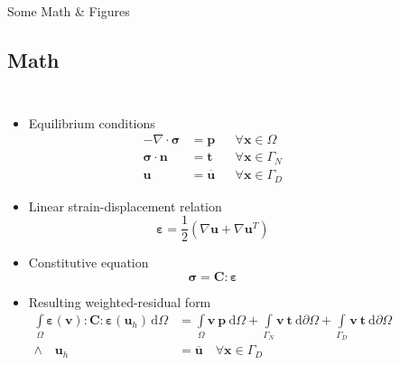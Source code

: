 \documentclass[8pt, handout, aspectratio = 1510]{beamer}
\begin{document}
	\begin{frame}{Some Math \& Figures}

		\subsection{Math}
		\begin{columns}
				\begin{itemize}
					\item Equilibrium conditions
							\begin{subequations}
								\begin{align}
									-\nabla \cdot \boldsymbol{\sigma} &= \boldsymbol{p} &&\forall \boldsymbol{x} \in \Omega \\
									\boldsymbol{\sigma} \cdot \boldsymbol{n} &= \boldsymbol{t} &&\forall \boldsymbol{x} \in \Gamma_N \\
									\boldsymbol{u} &= \overline{\boldsymbol{u}} &&\forall \boldsymbol{x} \in \Gamma_D
								\end{align}
							\end{subequations}

					\item Linear strain-displacement relation
						\begin{equation}
							\boldsymbol{\varepsilon} = \frac{1}{2} \left( \nabla \boldsymbol{u} + \nabla \boldsymbol{u}^T \right)
						\end{equation}

					\item Constitutive equation
						\begin{equation}
							\boldsymbol{\sigma} = \boldsymbol{C} : \boldsymbol{\varepsilon}
						\end{equation}

					\item Resulting weighted-residual form
						\begin{equation}
							\begin{aligned}
								\int \limits_\Omega \boldsymbol{\varepsilon}(\boldsymbol{v}) : \boldsymbol{C} : \boldsymbol{\varepsilon}(\boldsymbol{u}_h) \,\textrm{d}\Omega
								&= \int \limits_\Omega \boldsymbol{v}\ \boldsymbol{p}\ \textrm{d}\Omega
								+ \int \limits_{\Gamma_N} \boldsymbol{v}\ \boldsymbol{t}\ \textrm{d}\partial\Omega
								+ \int \limits_{\Gamma_D} \boldsymbol{v}\ \boldsymbol{t}\ \textrm{d}\partial\Omega \\
								\land \quad \boldsymbol{u}_h &= \overline{\boldsymbol{u}} \quad \forall \boldsymbol{x} \in \Gamma_D \\
							\end{aligned}
						\end{equation}


\end{itemize}
\end{columns}
\end{frame}
\end{document}
